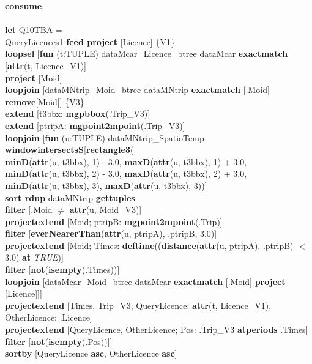 \documentclass[a4paper]{article}
\newcommand{\op}[1]{\textbf{#1}}
\newcommand{\true}{\textsl{TRUE}}
\begin{document}
\begin{scriptsize}
\begin{tabbing}
\op{consume};\\
\\
\op{let} Q10TBA =\\
\>QueryLicences1 \op{feed project} [Licence] \{V1\}\\
\>\op{loopsel} [\op{fun} (t:TUPLE) dataMcar\_Licence\_btree dataMcar \op{exactmatch} [\op{attr}(t, Licence\_V1)]\\
\>\>\op{project} [Moid]\\
\>\>\op{loopjoin} [dataMNtrip\_Moid\_btree dataMNtrip \op{exactmatch} [.Moid] \op{remove}[Moid]] \{V3\}\\
\>\>\op{extend} [t3bbx: \op{mgpbbox}(.Trip\_V3)]\\
\>\>\op{extend} [ptripA: \op{mgpoint2mpoint}(.Trip\_V3)]\\
\>\>\op{loopjoin} [\op{fun} (u:TUPLE) dataMNtrip\_SpatioTemp \op{windowintersectsS}[\op{rectangle3}(\\
\>\>\>\>\op{minD}(\op{attr}(u, t3bbx), 1) - 3.0, \op{maxD}(\op{attr}(u, t3bbx), 1) + 3.0,\\
\>\>\>\>\op{minD}(\op{attr}(u, t3bbx), 2) - 3.0, \op{maxD}(\op{attr}(u, t3bbx), 2) + 3.0,\\
\>\>\>\>\op{minD}(\op{attr}(u, t3bbx), 3), \op{maxD}(\op{attr}(u, t3bbx), 3))]\\
\>\>\>\op{sort rdup} dataMNtrip \op{gettuples}\\
\>\>\>\op{filter} [.Moid $\neq$ \op{attr}(u, Moid\_V3)]\\
\>\>\>\op{projectextend} [Moid; ptripB: \op{mgpoint2mpoint}(.Trip)]\\
\>\>\>\op{filter} [\op{everNearerThan}(\op{attr}(u, ptripA), .ptripB, 3.0)]\\
\>\>\>\op{projectextend} [Moid; Times: \op{deftime}((\op{distance}(\op{attr}(u, ptripA), .ptripB) $<$ 3.0) \op{at} \true{})]\\
\>\>\>\op{filter} [\op{not}(\op{isempty}(.Times))]\\
\>\>\>\op{loopjoin} [dataMcar\_Moid\_btree dataMcar \op{exactmatch} [.Moid] \op{project} [Licence]]]\\
\>\>\op{projectextend} [Times, Trip\_V3; QueryLicence: \op{attr}(t, Licence\_V1), OtherLicence: .Licence]\\
\>\>\op{projectextend} [QueryLicence, OtherLicence; Pos: .Trip\_V3 \op{atperiods} .Times]\\
\>\>\op{filter} [\op{not}(\op{isempty}(.Pos))]]\\
\>\op{sortby} [QueryLicence \op{asc}, OtherLicence \op{asc}]\\

\end{tabbing}
\end{scriptsize}
\end{document}
